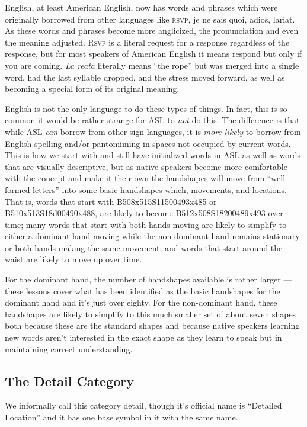 \documentclass{article}
\begin{document}
English, at least American English, now has words and phrases which were originally borrowed from other languages like \textsc{rsvp}, je ne sais quoi, adios, lariat.
As these words and phrases become more anglicized, the pronunciation and even the meaning adjusted.
\textsc{Rsvp} is a literal request for a response regardless of the response, but for most speakers of American English it means respond but only if you are coming.
\emph{La reata} literally means ``the rope'' but was merged into a single word, had the last syllable dropped, and the stress moved forward, as well as becoming a special form of its original meaning.

English is not the only language to do these types of things.
In fact, this is so common it would be rather strange for ASL to \emph{not} do this.
The difference is that while ASL \emph{can} borrow from other sign languages, it is \emph{more likely} to borrow from English spelling and/or pantomiming in spaces not occupied by current words.
This is how we start with and still have initialized words in ASL as well as words that are visually descriptive, but as native speakers become more comfortable with the concept and make it their own the handshapes will move from ``well formed letters'' into some basic handshapes which, movements, and locations.
That is, words that start with B508x515S11500493x485 or B510x513S18d00490x488, are likely to become B512x508S18200489x493 over time;
many words that start with both hands moving are likely to simplify to either a dominant hand moving while the non-dominant hand remains stationary or both hands making the same movement;
and words that start around the waist are likely to move up over time.

For the dominant hand, the number of handshapes available is rather larger --- these lessons cover what has been identified as the basic handshapes for the dominant hand and it's just over eighty.
For the non-dominant hand, these handshapes are likely to simplify to this much smaller set of about seven shapes both because these are the standard shapes and because native speakers learning new words aren't interested in the exact shape as they learn to speak but in maintaining correct understanding.

\subsection{The Detail Category}

We informally call this category detail, though it's official name is ``Detailed Location'' and it has one base symbol in it with the same name.
\end{document}
